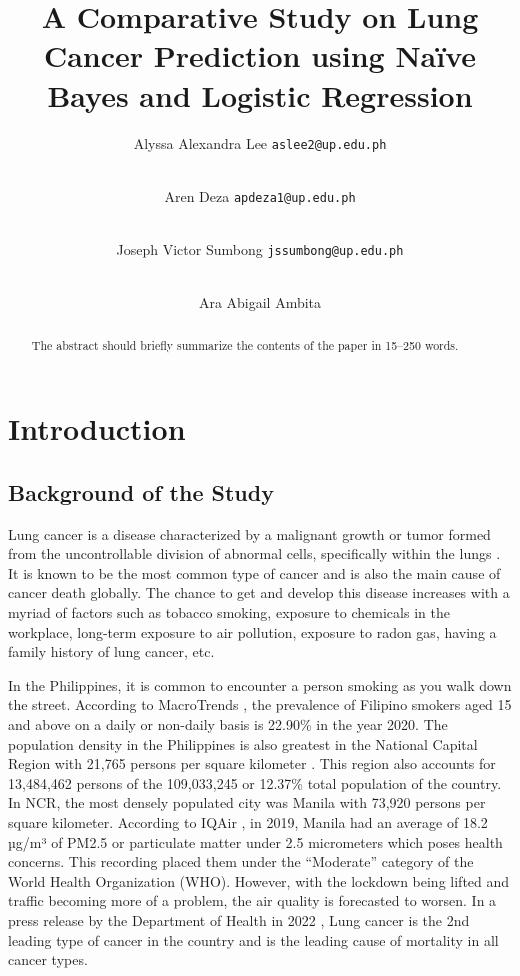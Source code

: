 \documentclass[runningheads]{llncs}
\title{\textbf{\LARGE A Comparative Study on Lung Cancer Prediction using Naïve Bayes and Logistic Regression}}
\author{Alyssa Alexandra Lee\inst{1} \texttt{aslee2@up.edu.ph} \and
\\ Aren Deza\inst{1} \texttt{apdeza1@up.edu.ph} \and
\\ Joseph Victor Sumbong\inst{1} \texttt{jssumbong@up.edu.ph} \and
\\ Ara Abigail Ambita\inst{1}}
\institute{University of The Philippines Visayas, Miag-ao, Iloilo City}
\begin{document}
\maketitle


\begin{abstract}
The abstract should briefly summarize the contents of the paper in
15--250 words.

\end{abstract}

\section{Introduction}

\subsection{Background of the Study}
Lung cancer is a disease characterized by a malignant growth or tumor formed from the uncontrollable division of abnormal cells, specifically within the lungs \cite{cancerResearchUK2019}. It is known to be the most common type of cancer and is also the main cause of cancer death globally. The chance to get and develop this disease increases with a myriad of factors such as tobacco smoking, exposure to chemicals in the workplace, long-term exposure to air pollution, exposure to radon gas, having a family history of lung cancer, etc.

In the Philippines, it is common to encounter a person smoking as you walk down the street. According to MacroTrends \cite{macrotrends2022}, the prevalence of Filipino smokers aged 15 and above on a daily or non-daily basis is 22.90\% in the year 2020. The population density in the Philippines is also greatest in the National Capital Region with 21,765 persons per square kilometer \cite{philippinestatisticsauthority2021}. This region also accounts for 13,484,462 persons of the 109,033,245 or 12.37\% total population of the country. In NCR, the most densely populated city was Manila with 73,920 persons per square kilometer. According to IQAir \cite{IQAir2022}, in 2019, Manila had an average of 18.2 µg/m³ of PM2.5 or particulate matter under 2.5 micrometers which poses health concerns. This recording placed them under the “Moderate” category of the World Health Organization (WHO). However, with the lockdown being lifted and traffic becoming more of a problem, the air quality is forecasted to worsen. In a press release by the  Department of Health in 2022 \cite{doh2021}, Lung cancer is the 2nd leading type of cancer in the country and is the leading cause of mortality in all cancer types. 
\end{document}

